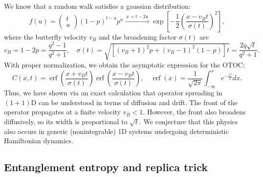 \documentclass{SciPost}
\begin{document}
We know that a random walk satisfies a gaussian distribution:
\begin{equation}
	f(u) = \begin{pmatrix} t \\ u \end{pmatrix} (1-p)^{t-u} p^u
	\xrightarrow{\ x=t-2u\ } \exp\left[-\frac{1}{2}\left(\frac{x - v_B t}{\sigma(t)}\right)^2\right],
\end{equation}
where the butterfly velocity $v_B$ and the broadening factor $\sigma(t)$ are
\begin{equation}
	v_B = 1-2p = \frac{q^2-1}{q^2+1},\quad 
	\sigma(t) = \sqrt{\left[(v_B+1)^2 p + (v_B-1)^2(1-p)\right]t} = \frac{2 q \sqrt t}{q^2+1}.
\end{equation}
With proper normalization, we obtain the asymptotic expression for the OTOC:
\begin{equation}
	C(x,t) = \operatorname{erf}\left(\frac{x + v_B t}{\sigma(t)}\right) \operatorname{erf}\left(\frac{x - v_B t}{\sigma(t)}\right), \quad
	\operatorname{erf}(x) = \frac{1}{\sqrt{2\pi}} \int_{-\infty}^x e^{-\frac{x^2}{2}} dx.
\end{equation}
Thus, we have shown via an exact calculation that operator spreading in $(1+1)$D can be understood in terms of diffusion and drift. 
The front of the operator propagates at a finite velocity $v_B < 1$. 
However, the front also broadens diffusively, so its width is proportional to $\sqrt{t}$.
We conjecture that this physics also occurs in generic (nonintegrable) 1D systems undergoing deterministic Hamiltonian dynamics. 


\subsection{Entanglement entropy and replica trick}
\end{document}
